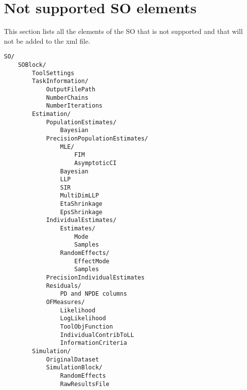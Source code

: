 \section{Not supported SO elements}

This section lists all the elements of the SO that is not supported and that will not be added to the xml file.

\begin{verbatim}
SO/
    SOBlock/
        ToolSettings
        TaskInformation/
            OutputFilePath
            NumberChains
            NumberIterations
        Estimation/
            PopulationEstimates/
                Bayesian
            PrecisionPopulationEstimates/
                MLE/
                    FIM
                    AsymptoticCI
                Bayesian
                LLP
                SIR
                MultiDimLLP
                EtaShrinkage
                EpsShrinkage
            IndividualEstimates/
                Estimates/
                    Mode
                    Samples
                RandomEffects/
                    EffectMode
                    Samples
            PrecisionIndividualEstimates
            Residuals/
                PD and NPDE columns
            OFMeasures/
                Likelihood
                LogLikelihood
                ToolObjFunction
                IndividualContribToLL
                InformationCriteria
        Simulation/
            OriginalDataset
            SimulationBlock/
                RandomEffects
                RawResultsFile
\end{verbatim}



